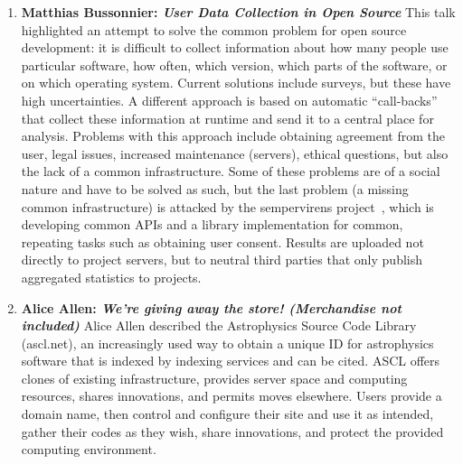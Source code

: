 \documentclass[11pt, oneside]{amsart}
\begin{document}
\begin{enumerate}
\item \textbf{Matthias Bussonnier: \textit{User Data Collection in Open Source}}
This talk highlighted an attempt to solve the common problem for open source
development: it is difficult to collect information about how many people use
particular software, how often, which version, which parts of the software, or
on which operating system. Current solutions include surveys, but these have
high uncertainties. A different approach is based on automatic ``call-backs''
that collect these information at runtime and send it to a central place for
analysis. Problems with this approach include obtaining agreement from the user,
legal issues, increased maintenance (servers), ethical questions, but also the
lack of a common infrastructure. Some of these problems are of a social nature
and have to be solved as such, but the last problem (a missing common
infrastructure) is attacked by the sempervirens project~\cite{sempervirens},
which is developing common APIs and a library implementation for common,
repeating tasks such as obtaining user consent. Results are uploaded not
directly to project servers, but to neutral third parties that only publish
aggregated statistics to projects.

\item \textbf{Alice Allen: \textit{We're giving away the store! (Merchandise not
included)}} Alice Allen described the Astrophysics Source Code Library
(ascl.net), an increasingly used way to obtain a unique ID for astrophysics
software that is indexed by indexing services and can be cited. ASCL offers
clones of existing infrastructure, provides server space and computing
resources, shares innovations, and permits moves elsewhere. Users provide a
domain name, then control and configure their site and use it as intended,
gather their codes as they wish, share innovations, and protect the provided
computing environment.


\end{enumerate}
\end{document}
